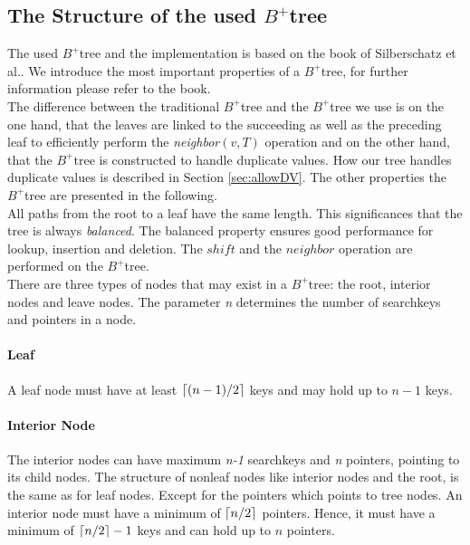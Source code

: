 \documentclass[abstracton,12pt]{scrreprt}
\DeclarePairedDelimiter\ceil{\lceil}{\rceil}
\begin{document}
\subsection{The Structure of the used $B^+$tree}
\label{structureBtree}
The used $B^+$tree and the implementation is based on the book of Silberschatz et al.\cite{DatabaseSystemC}. We introduce the most important properties of a $B^+$tree, for further information please refer to the book.\\
The difference between the traditional $B^+$tree and the $B^+$tree we use is on the one hand, that the leaves are linked to the succeeding as well as the preceding leaf to efficiently perform the \emph{neighbor}$(v,T)$ operation and on the other hand, that the $B^+$tree is constructed to handle duplicate values. How our tree handles duplicate values is described in Section \ref{sec:allowDV}. The other properties the $B^+$tree are presented in the following.\\
All paths from the root to a leaf have the same length. This significances that the tree is always \emph{balanced}. The balanced property ensures good performance for lookup, insertion and deletion. The $shift$ and the $neighbor$ operation are performed on the $B^+$tree.\\There are three types of nodes that may exist in a $B^+$tree: the root, interior nodes and leave nodes. The parameter \emph{n} determines the number of searchkeys and pointers in a node.

\paragraph{Leaf}
A leaf node must have at least $\ceil{(n-1)/2}$ keys and may hold up to $n-1$ keys.
\paragraph{Interior Node}
The interior nodes can have maximum \emph{n-1} searchkeys and \emph{n} pointers, pointing to its child nodes. The structure of nonleaf nodes like interior nodes and the root, is the same as for leaf nodes. Except for the pointers which points to tree nodes. An interior node must have a minimum of $\ceil{n/2}$ pointers. Hence, it must have a minimum of $\ceil{n/2}-1$ keys and can hold up to $n$ pointers.
\end{document}
